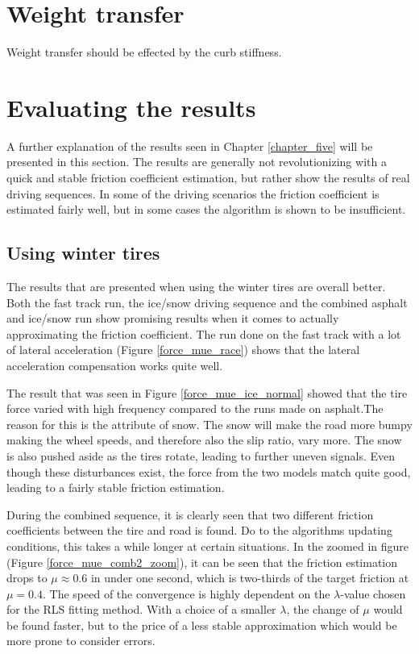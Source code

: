 \section{Weight transfer}
Weight transfer should be effected by the curb stiffness. 

\section{Evaluating the results}

A further explanation of the results seen in Chapter \ref{chapter_five} will be presented in this section. The results are generally not revolutionizing with a quick and stable friction coefficient estimation, but rather show the results of real driving sequences. In some of the driving scenarios the friction coefficient is estimated fairly well, but in some cases the algorithm is shown to be insufficient. 

\subsection{Using winter tires}
The results that are presented when using the winter tires are overall better. Both the fast track run, the ice/snow driving sequence and the combined asphalt and ice/snow run show promising results when it comes to actually approximating the friction coefficient. The run done on the fast track with a lot of lateral acceleration (Figure \ref{force_mue_race}) shows that the lateral acceleration compensation works quite well.

The result that was seen in Figure \ref{force_mue_ice_normal} showed that the tire force varied with high frequency compared to the runs made on asphalt.The reason for this is the attribute of snow. The snow will make the road more bumpy making the wheel speeds, and therefore also the slip ratio, vary more. The snow is also pushed aside as the tires rotate, leading to further uneven signals. Even though these disturbances exist, the force from the two models match quite good, leading to a fairly stable friction estimation. 

During the combined sequence, it is clearly seen that two different friction coefficients between the tire and road is found. Do to the algorithms updating conditions, this takes a while longer at certain situations. In the zoomed in figure (Figure \ref{force_mue_comb2_zoom}), it can be seen that the friction estimation drops to $ \mu \approx 0.6 $ in under one second, which is two-thirds of the target friction at $ \mu = 0.4 $. The speed of the convergence is highly dependent on the $ \lambda $-value chosen for the RLS fitting method. With a choice of a smaller $ \lambda $, the change of $ \mu $ would be found faster, but to the price of a less stable approximation which would be more prone to consider errors. 

